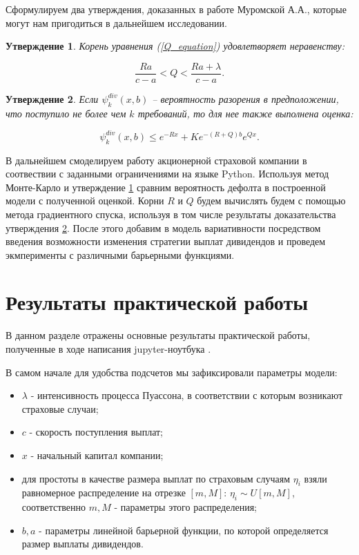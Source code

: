 \documentclass{article}
\theoremstyle{plain}
\theoremstyle{plain}
\theoremstyle{plain}
\theoremstyle{plain}
\newtheorem{claim}{Утверждение}[section]
\theoremstyle{definition}
\theoremstyle{remark}
\begin{document}
Сформулируем два утверждения, доказанных в работе Муромской А.А., которые могут нам пригодиться в дальнейшем исследовании.

\begin{claim}
\label{claim_1}
    Корень уравнения (\ref{Q_equation}) удовлетворяет неравенству:
    
    \begin{equation}
        \frac{Ra}{c - a} < Q < \frac{Ra + \lambda}{c - a}.
    \end{equation}
\end{claim}

\begin{claim}
\label{claim_2}
    Если $\psi_k^{div}(x, b)$ -- вероятность разорения в предположении, что поступило не более чем  $k$ требований, то для нее также выполнена оценка:
    
    \begin{equation}
        \psi_k^{div}(x, b) \leq e^{-Rx} + K e^{-(R + Q)b} e^{Qx}.
    \end{equation}
\end{claim}

В дальнейшем смоделируем работу акционерной страховой компании в соотвествии с заданными ограничениями на языке Python. Используя метод Монте-Карло и утверждение \ref{claim_1} сравним вероятность дефолта в построенной модели с полученной оценкой. Корни $R$ и $Q$ будем вычислять будем с помощью метода градиентного спуска, используя в том числе результаты доказательства утверждения \ref{claim_2}. После этого добавим в модель вариативности посредством введения возможности изменения стратегии выплат дивидендов и проведем экмперименты с различными барьерными функциями.


\section{Результаты практической работы}

В данном разделе отражены основные результаты практической работы, полученные в ходе написания jupyter-ноутбука \cite{model-juyter-notebook}.

В самом начале для удобства подсчетов мы зафиксировали параметры модели:

\begin{itemize}
    \item $\lambda$ - интенсивность процесса Пуассона, в соответствии с которым возникают страховые случаи;
    \item $c$ - скорость поступления выплат;
    \item $x$ - начальный капитал компании;
    \item для простоты в качестве размера выплат по страховым случаям $\eta_i$ взяли равномерное распределение на отрезке $[m, M]$: $\eta_i \sim U[m, M]$, соответственно $m, M$ - параметры этого распределения;
    \item $b, a$ - параметры линейной барьерной функции, по которой определяется размер выплаты дивидендов.
\end{itemize}
\end{document}
